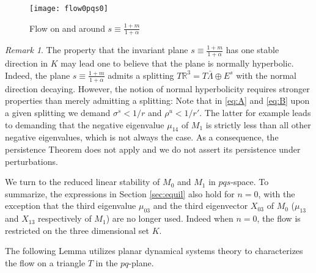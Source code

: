 \documentclass[11pt]{article}
\theoremstyle{remark}
\newtheorem{remark}{Remark}[section]
\begin{document}
\begin{figure}[ht]
 \centering
 \texttt{[image: flow0pqs0]}
 \caption{Flow on and around $s\equiv\tfrac{1+m}{1+ \alpha}$} \label{fig:n0pqs}
\end{figure}

\begin{remark} \label{plane_hyp}
The property that the invariant plane $s\equiv\tfrac{1+m}{1+ \alpha}$ has one stable direction in $K$  may lead one to believe that the plane is normally hyperbolic.
Indeed, the plane $s\equiv\tfrac{1+m}{1+ \alpha}$ admits a splitting $T\mathbb{R}^3=T\bar\Lambda \oplus E^s$ with the normal direction decaying.
However, the notion of normal hyperbolicity requires stronger properties than merely admitting a splitting: Note that in \eqref{eq:A} and \eqref{eq:B} upon a given splitting we demand $\sigma^s<1/r$ and $\rho^u<1/r'$. The latter for example leads to demanding that the negative eigenvalue $\mu_{14}$ of $M_1$ is strictly less than all other negative eigenvalues, which is not always the case. As a consequence, the persistence Theorem does not apply and we do not assert its persistence under perturbations.
\end{remark}


We turn to the reduced linear stability of $M_0$ and $M_1$ in $pqs$-space. To summarize, the expressions in Section \ref{sec:equil} also hold for $n=0$, with the exception that the third eigenvalue $\mu_{03}$ and the third eigenvector $X_{03}$ of $M_0$ ($\mu_{13}$ and $X_{13}$ respectively of $M_1$) are no longer used. Indeed when $n=0$, the flow is restricted on the three dimensional set $K$. %

The following Lemma utilizes planar dynamical systems theory to characterizes the flow on a triangle $T$ in the $pq$-plane. %
\end{document}
